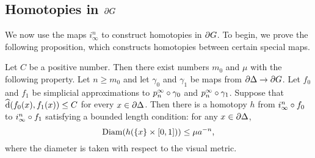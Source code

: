 \documentclass[a4paper]{article}
\begin{document}
\subsection{Homotopies in $\partial G$}

We now use the maps $i^n_\infty$ to construct homotopies in $\partial G$. To
begin, we prove the following proposition, which constructs homotopies between
certain special maps.

\begin{proposition}\label{prop:basic_homotopies}
  Let $C$ be a positive number. Then there exist numbers $m_0$ and $\mu$
  with the following property. Let $n \geq m_0$ and let $\gamma_0$ and
  $\gamma_1$ be maps from $\partial\Delta\to\partial G$. Let $f_0$ and $f_1$
  be simplicial approximations to $p^\infty_n\circ \gamma_0$ and
  $p^\infty_n\circ\gamma_1$. Suppose that $\operatorname{\widehat{d}}(f_0(x), f_1(x))\leq C$
  for every $x \in \partial \Delta$. Then there is a homotopy $h$ from
  $i^n_\infty\circ f_0$ to $i^n_\infty\circ f_1$ satisfying a bounded
  length condition: for any $x \in \partial\Delta$,
  \begin{equation*}
    \operatorname{Diam}(h(\{x\} \times [0,1])) \leq \mu a^{-n},
  \end{equation*}
  where the diameter is taken with respect to the visual metric.
\end{proposition}
\end{document}
